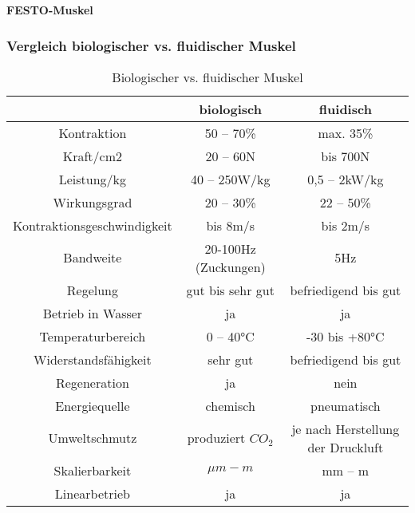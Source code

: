\textbf{FESTO-Muskel}

\subsubsection{Vergleich biologischer vs. fluidischer Muskel}
\begin{table}[hbt]
\centering
\begin{tabular}{|c||c|c|}
\hline
 & \textbf{biologisch} & \textbf{fluidisch} \\
\hline
Kontraktion &  50 – 70\%  & max. 35\%\\
Kraft/cm2  & 20 – 60N  & bis 700N\\
Leistung/kg  & 40 – 250W/kg  & 0,5 – 2kW/kg\\
Wirkungsgrad  & 20 – 30\%  & 22 – 50\%\\
Kontraktionsgeschwindigkeit  & bis 8m/s  & bis 2m/s\\
Bandweite  & 20-100Hz (Zuckungen) & 5Hz\\
Regelung & gut bis sehr gut & befriedigend bis gut\\
Betrieb in Wasser & ja & ja\\
Temperaturbereich & 0 – 40°C & -30 bis +80°C\\
Widerstandsfähigkeit & sehr gut & befriedigend bis gut\\
Regeneration & ja & nein\\
Energiequelle & chemisch & pneumatisch\\
Umweltschmutz & produziert $CO_2$ & je nach Herstellung der Druckluft\\
Skalierbarkeit & $\mu m - m$ & mm – m\\
Linearbetrieb & ja & ja\\
\hline
\end{tabular}
\caption{Biologischer vs. fluidischer Muskel}
\label{tab:Vergleich}
\end{table}
